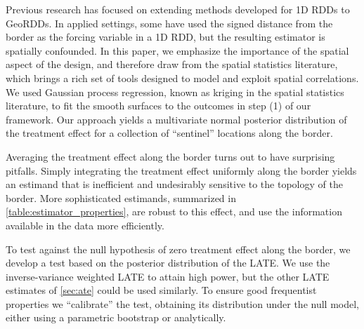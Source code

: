 Previous research has focused on extending methods developed for 1D RDDs to GeoRDDs.
In applied settings, some have used the signed distance from the border as the forcing variable in a 1D RDD, but the resulting estimator is spatially confounded.
In this paper, we emphasize the importance of the spatial aspect of the design, and therefore draw from the spatial statistics literature, which brings a rich set of tools designed to model and exploit spatial correlations.
We used Gaussian process regression, known as kriging in the spatial statistics literature, to fit the smooth surfaces to the outcomes in step (1) of our framework.
Our approach yields a multivariate normal posterior distribution of the treatment effect for a collection of ``sentinel'' locations along the border.

Averaging the treatment effect along the border turns out to have surprising pitfalls.
Simply integrating the treatment effect uniformly along the border yields an estimand that is inefficient and undesirably sensitive to the topology of the border.
More sophisticated estimands, summarized in \autoref{table:estimator_properties}, are robust to this effect, and use the information available in the data more efficiently.

To test against the null hypothesis of zero treatment effect along the border, we develop a test based on the posterior distribution of the LATE.
We use the inverse-variance weighted LATE to attain high power, but the other LATE estimates of \autoref{sec:ate} could be used similarly.
To ensure good frequentist properties we “calibrate” the test, obtaining its distribution under the null model, either using a parametric bootstrap or analytically.

